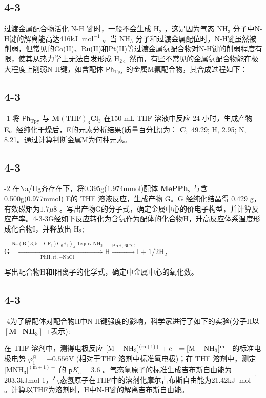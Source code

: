 \subsection*{4-3}
过渡金属配合物活化 N-H 键时，一般不会生成 $\mathrm { H } _ { 2 }$ ，这是因为气态 $\mathrm { N H } _ { 3 }$ 分子中N-H键的解离能高达416kJ $\mathrm { \ m o l ^ { - 1 } }$ 。当 $\mathrm { N H } _ { 3 }$ 分子和过渡金属配位时，N-H键虽然被削弱，但常见的Co(II)、Ru(II)和Pt(II)等过渡金属氨配合物对N-H键的削弱程度有限，使其从热力学上无法自发形成 $\mathrm { H } _ { 2 \mathrm { ~ c ~ } }$ 然而，有些不常见的金属氨配合物能在极大程度上削弱N-H键，如含配体 $\mathsf { P h } _ { \mathrm { T p y } }$ 的金属M氨配合物，其合成过程如下：

\subsection*{4-3}
-1 将 $\mathsf { P h } _ { \mathrm { T p y } }$ 与 $\mathbf { M } ( \mathrm { T H F } ) _ { 3 } \mathbf { C } \mathrm { l } _ { 3 }$ 在150 mL THF 溶液中反应 24 小时，生成产物E。经纯化干燥后，E的元素分析结果(质量百分比)为： $\mathbf { C } ,$ 49.29; H, 2.95; N, 8.21。通过计算判断金属M为何种元素。

\subsection*{4-3}
-2 在Na/Hg齐存在下，将0.395g(1.974mmol)配体 $\mathbf { M e P P h } _ { 2 }$ 与含0.500g(0.977mmol) E的 THF 溶液反应，生成产物 G。G 经纯化结晶得 0.429 g，有效磁矩为$1 . 7 \mu 8$ 。写出产物G的分子式，确定金属中心的价电子构型，并计算反应产率。4-3-3G经如下反应转化为含氨作为配体的化合物H，升高反应体系温度形成化合物I，并释放出 $\mathrm { H } _ { 2 } ;$

$
\mathrm{G} \xrightarrow [ \mathrm{PhH} , \mathrm{rt} , - \mathrm{NaCl} ]{\mathrm{Na} (\mathrm{B} (3 , 5 - \mathrm{CF} _ {3}) \mathrm{C} _ {6} \mathrm{H} _ {3}) _ {4} , 1 \text {equiv.} \mathrm{NH} _ {3}} \mathrm{H} \xrightarrow {\mathrm{PhH} , 6 0 ^ {\circ} \mathrm{C}} \mathrm{I} + 1 / 2 \mathrm{H} _ {2}
$

写出配合物H和Ⅰ阳离子的化学式，确定中金属中心的氧化数。

\subsection*{4-3}
-4为了解配体对配合物H中N-H键强度的影响，科学家进行了如下的实验(分子H以 $[ \mathbf { M } \mathbf { - N H } _ { 3 } ]$ +表示):

在 THF 溶剂中，测得电极反应 $\mathrm { \small { [ M - N H _ { 3 } ] ^ { ( m + 1 ) + } + e ^ { - } = [ M - N H _ { 3 } ] ^ { m + } } }$ 的标准电极电势 $\varphi _ { 1 } ^ { \ominus } = - 0 . 5 5 6 \mathrm { V }$ (相对于THF 溶剂中标准氢电极)；在 THF 溶剂中，测定[M$\mathrm { N H } _ { 3 } ] ^ { ( \mathrm { m + 1 } ) + }$ 的 $\mathtt { p } K _ { \mathtt { a } } = 3 . 6$ 。气态氢原子的标准生成吉布斯自由能为203.3kJmol-1，气态氢原子在THF中的溶剂化摩尔吉布斯自由能为21.42kJ $\mathrm { \ m o l ^ { - 1 } }$ 。计算以THF为溶剂时，H中N-H键的解离吉布斯自由能。
